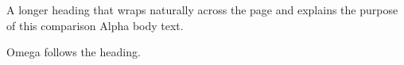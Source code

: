 \documentclass[11pt,aspectratio=169]{beamer}
\date{}
\begin{document}
\begin{frame}[t]{A longer heading that wraps naturally across the page and explains the purpose of this comparison}
Alpha body text.

Omega follows the heading.
\end{frame}
\end{document}
